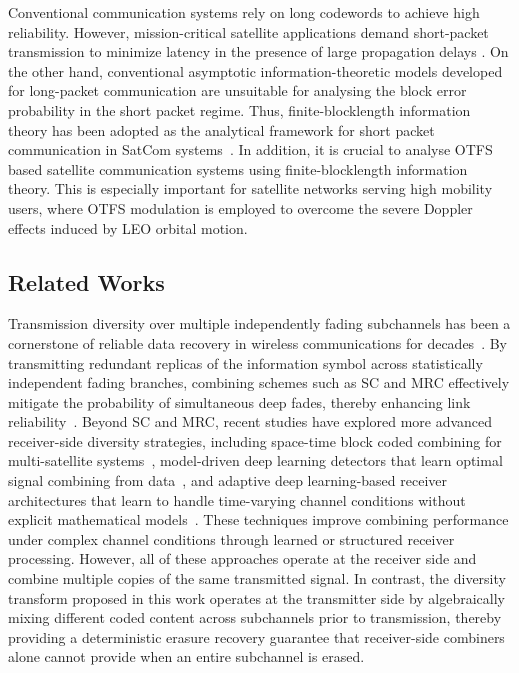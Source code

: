 \documentclass[journal]{IEEEtran}
\begin{document}
Conventional communication systems rely on long codewords to achieve high reliability. However, mission-critical satellite applications demand short-packet transmission to minimize latency in the presence of large propagation delays \cite{Durisi2016,Basnayaka2022,Polyanskiy2010}. On the other hand, conventional asymptotic information-theoretic models developed for long-packet communication are unsuitable for analysing the block error probability in the short packet regime. Thus, finite-blocklength information theory has been adopted as the analytical framework for short packet communication in SatCom systems~\cite{10609803}. In addition, it is crucial to analyse OTFS based satellite communication systems using finite-blocklength information theory. This is especially important for satellite networks serving high mobility users, where OTFS modulation is employed to overcome the severe Doppler effects induced by LEO orbital motion.

\subsection{Related Works}
\label{sec:related_works}

\par Transmission diversity over multiple independently fading subchannels has been a cornerstone of reliable data recovery in wireless communications for decades~\cite{661038,11202644}.  By transmitting redundant replicas of the information symbol across statistically independent fading branches, combining schemes such as SC and MRC effectively mitigate the probability of simultaneous deep fades, thereby enhancing link reliability~\cite{Cacuango2025}. Beyond SC and MRC, recent studies have explored more advanced receiver-side diversity strategies, including space-time block coded combining for multi-satellite systems~\cite{Singh2024}, model-driven deep learning detectors that learn optimal signal combining from data~\cite{He2020DL, Hu2023DL}, and adaptive deep learning-based receiver architectures that learn to handle time-varying channel conditions without explicit mathematical models~\cite{Doha2025}. These techniques improve combining performance under complex channel conditions through learned or structured receiver processing. However, all of these approaches operate at the receiver side and combine multiple copies of the same transmitted signal. In contrast, the diversity transform proposed in this work operates at the transmitter side by algebraically mixing different coded content across subchannels prior to transmission, thereby providing a deterministic erasure recovery guarantee that receiver-side combiners alone cannot provide when an entire subchannel is erased.
\end{document}
